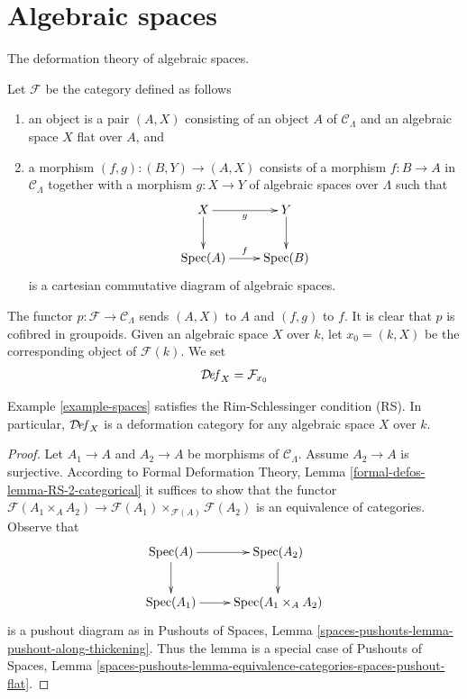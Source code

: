 \section{Algebraic spaces}
\label{section-algebraic-spaces}

\noindent
The deformation theory of algebraic spaces.

\begin{example}
\label{example-spaces}
Let $\mathcal{F}$ be the category defined as follows
\begin{enumerate}
\item an object is a pair $(A, X)$ consisting of an
object $A$ of $\mathcal{C}_\Lambda$ and an algebraic space
$X$ flat over $A$, and
\item a morphism $(f, g) : (B, Y) \to (A, X)$ consists of
a morphism $f : B \to A$ in $\mathcal{C}_\Lambda$ together
with a morphism $g : X \to Y$ of algebraic spaces over $\Lambda$
such that
$$
\xymatrix{
X \ar[r]_g \ar[d] & Y \ar[d] \\
\Spec(A) \ar[r]^f & \Spec(B)
}
$$
is a cartesian commutative diagram of algebraic spaces.
\end{enumerate}
The functor $p : \mathcal{F} \to \mathcal{C}_\Lambda$ sends $(A, X)$
to $A$ and $(f, g)$ to $f$. It is clear that $p$ is cofibred in groupoids.
Given an algebraic space $X$ over $k$, let
$x_0 = (k, X)$ be the corresponding object of $\mathcal{F}(k)$. We set
$$
\mathcal{D}\!\mathit{ef}_X = \mathcal{F}_{x_0}
$$
\end{example}

\begin{lemma}
\label{lemma-spaces-RS}
Example \ref{example-spaces}
satisfies the Rim-Schlessinger condition (RS).
In particular, $\mathcal{D}\!\mathit{ef}_X$ is a deformation category
for any algebraic space $X$ over $k$.
\end{lemma}

\begin{proof}
Let $A_1 \to A$ and $A_2 \to A$ be morphisms of $\mathcal{C}_\Lambda$.
Assume $A_2 \to A$ is surjective. According to
Formal Deformation Theory, Lemma
\ref{formal-defos-lemma-RS-2-categorical}
it suffices to show that the functor
$\mathcal{F}(A_1 \times_A A_2) \to
\mathcal{F}(A_1) \times_{\mathcal{F}(A)} \mathcal{F}(A_2)$
is an equivalence of categories.
Observe that
$$
\xymatrix{
\Spec(A) \ar[r] \ar[d] & \Spec(A_2) \ar[d] \\
\Spec(A_1) \ar[r] &
\Spec(A_1 \times_A A_2)
}
$$
is a pushout diagram as in Pushouts of Spaces, Lemma
\ref{spaces-pushouts-lemma-pushout-along-thickening}.
Thus the lemma is a special case of Pushouts of Spaces, Lemma
\ref{spaces-pushouts-lemma-equivalence-categories-spaces-pushout-flat}.
\end{proof}


